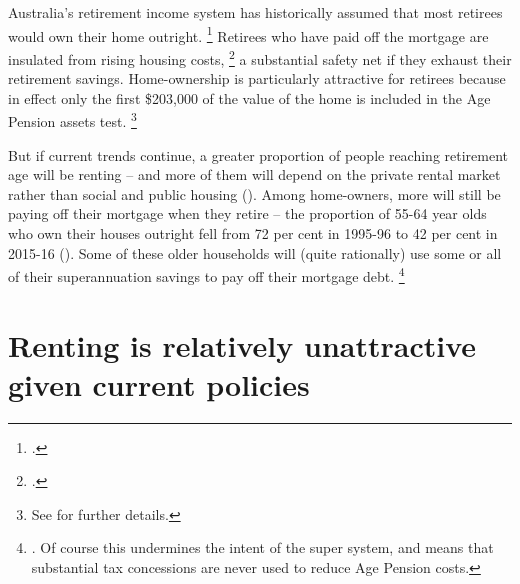 Australia's retirement income system has historically assumed that most retirees would own their home outright.%
	\footcite{Yates2015}
Retirees who have paid off the mortgage are insulated from rising housing costs,%
	\footcites{Yates2015}{Eslake-AIST}
a substantial safety net if they exhaust their retirement savings.
Home-ownership is particularly attractive for retirees because in effect only the first \$203,000 of the value of the home is included in the Age Pension assets test.%
	\footnote{See  for further details.}


But if current trends continue, a greater proportion of people reaching retirement age will be renting -- and more of them will depend on the private rental market rather than social and public housing ().
Among home-owners, more will still be paying off their mortgage when they retire -- the proportion of 55-64 year olds who own their houses outright fell from 72 per cent in 1995-96 to 42 per cent in 2015-16 ().
Some of these older households will (quite rationally) use some or all of their superannuation savings to pay off their mortgage debt.%
	\footnote{\textcite[][10]{Eslake-AIST}. Of course this undermines the intent of the super system, and means that substantial tax concessions are never used to reduce Age Pension costs.}




\section{Renting is relatively unattractive given current policies }\label{sec:renting-is-relatively-unattractive-under-current-policy-settings}

